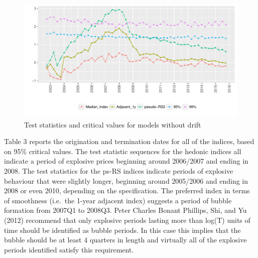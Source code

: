 \documentclass[]{elsarticle} %
\makeatletter
\def\maxwidth{\ifdim\Gin@nat@width>\linewidth\linewidth
\else\Gin@nat@width\fi}
\let\Oldincludegraphics\includegraphics
\renewcommand{\includegraphics}[1]{\Oldincludegraphics[width=\maxwidth]{#1}}
\makeatother
\begin{document}
\begin{figure}[htbp]
\centering
\includegraphics{Art_Price_Indices_5_J_files/figure-latex/figure15-1.pdf}
\caption{Test statistics and critical values for models without drift}
\end{figure}

Table 3 reports the origination and termination dates for all of the
indices, based on 95\% critical values. The test statistic sequences for
the hedonic indices all indicate a period of explosive prices beginning
around 2006/2007 and ending in 2008. The test statistics for the ps-RS
indices indicate periods of explosive behaviour that were slightly
longer, beginning around 2005/2006 and ending in 2008 or even 2010,
depending on the specification. The preferred index in terms of
smoothness (i.e.~the 1-year adjacent index) suggests a period of bubble
formation from 2007Q1 to 2008Q3. Peter Charles Bonant Phillips, Shi, and
Yu (2012) recommend that only explosive periods lasting more than log(T)
units of time should be identified as bubble periods. In this case this
implies that the bubble should be at least 4 quarters in length and
virtually all of the explosive periods identified satisfy this
requirement.

\begin{table}[ht]
\centering
\caption{Dates of explosive behaviour} 
\end{table}
\end{document}
